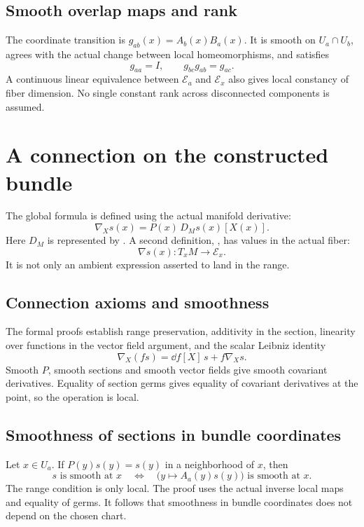 \subsection{Smooth overlap maps and rank}
The coordinate transition is $g_{ab}(x)=A_b(x)B_a(x)$. It is smooth on $U_a\cap U_b$, agrees with the actual change between local homeomorphisms, and satisfies
\[
g_{aa}=I,\qquad g_{bc}g_{ab}=g_{ac}.
\]
A continuous linear equivalence between $\mathcal E_a$ and $\mathcal E_x$ also gives local constancy of fiber dimension. No single constant rank across disconnected components is assumed.





\section{A connection on the constructed bundle}\label{supp6:section:003}
The global formula is defined using the actual manifold derivative:
\[
\nabla_Xs(x)=P(x)\,D_Ms(x)[X(x)].
\]
Here $D_M$ is represented by . A second definition, , has values in the actual fiber:
\[
\nabla s(x):T_xM\longrightarrow\mathcal E_x.
\]
It is not only an ambient expression asserted to land in the range.

\subsection{Connection axioms and smoothness}
The formal proofs establish range preservation, additivity in the section, linearity over functions in the vector field argument, and the scalar Leibniz identity
\[
\nabla_X(fs)=\dd f[X]\,s+f\nabla_Xs.
\]
Smooth $P$, smooth sections and smooth vector fields give smooth covariant derivatives. Equality of section germs gives equality of covariant derivatives at the point, so the operation is local.

\subsection{Smoothness of sections in bundle coordinates}
Let $x\in U_a$. If $P(y)s(y)=s(y)$ in a neighborhood of $x$, then
\[
s\text{ is smooth at }x
\quad\Longleftrightarrow\quad
\bigl(y\mapsto A_a(y)s(y)\bigr)\text{ is smooth at }x.
\]
The range condition is only local. The proof uses the actual inverse local maps and equality of germs. It follows that smoothness in bundle coordinates does not depend on the chosen chart.

